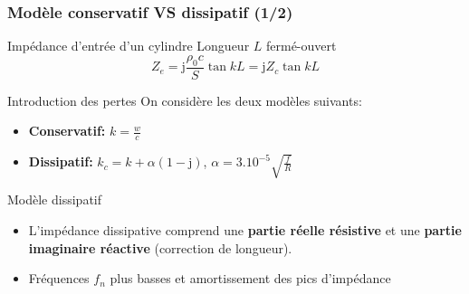 \begin{frame}
  \frametitle{Modèle conservatif VS dissipatif (1/2)}
\begin{block}{Impédance d'entrée d'un cylindre}
  Longueur $L$ fermé-ouvert
  \begin{equation*}
    Z_e = \mbox{j} \frac{\rho_0 c}{S} \tan{kL} =  \mbox{j} Z_c \tan{kL}
 \end{equation*}
 \end{block}


 \pause
 \begin{exampleblock}{Introduction des pertes}
 On considère les deux modèles suivants:
  \begin{itemize}
    \item \textbf{Conservatif:} $k = \frac{w}{c}$
    \item \textbf{Dissipatif:} $k_c = k + \alpha (1 - \mbox{j})$, \hspace{20pt}
    $\alpha = 3.10^{-5} \sqrt{\frac{f}{R}}$
  \end{itemize}
 \end{exampleblock}

  \pause
  \begin{block}{Modèle dissipatif}
    \begin{itemize}
      \item L'impédance dissipative comprend une \textbf{partie réelle résistive} 
        et une \textbf{partie imaginaire réactive} (correction de longueur).
      \pause
      \item Fréquences $f_n$ plus basses et amortissement des pics d'impédance
    \end{itemize}
  \end{block}
\end{frame}



